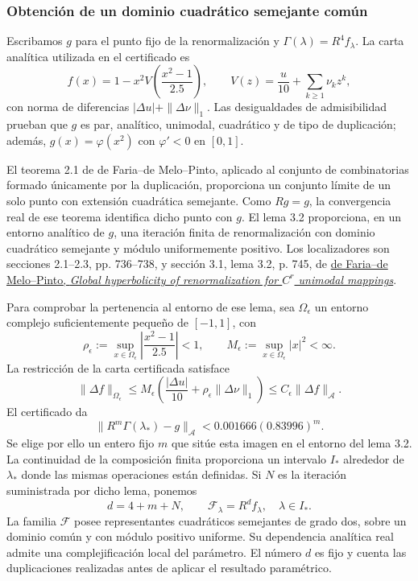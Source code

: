 \subsubsection{Obtención de un dominio cuadrático semejante común}
\label{hmtfg:clasificacion:8.1}

Escribamos \(g\) para el punto fijo de la renormalización y
\(\Gamma(\lambda)=R^4f_\lambda\). La carta analítica utilizada en el certificado es
\[
f(x)=1-x^2V\!\left(\frac{x^2-1}{2.5}\right),\qquad
V(z)=\frac{u}{10}+\sum_{k\ge1}\nu_kz^k,
\]
con norma de diferencias \(|\Delta u|+\|\Delta\nu\|_1\). Las desigualdades de admisibilidad prueban que \(g\) es par, analítico, unimodal, cuadrático y de tipo de duplicación; además, \(g(x)=\varphi(x^2)\) con \(\varphi'<0\) en \([0,1]\).

El teorema 2.1 de de Faria–de Melo–Pinto, aplicado al conjunto de combinatorias formado únicamente por la duplicación, proporciona un conjunto límite de un solo punto con extensión cuadrática semejante. Como \(Rg=g\), la convergencia real de ese teorema identifica dicho punto con \(g\). El lema 3.2 proporciona, en un entorno analítico de \(g\), una iteración finita de renormalización con dominio cuadrático semejante y módulo uniformemente positivo. Los localizadores son secciones 2.1–2.3, pp. 736–738, y sección 3.1, lema 3.2, p. 745, de \href{https://annals.math.princeton.edu/wp-content/uploads/annals-v164-n3-p01.pdf}{de Faria–de Melo–Pinto, \emph{Global hyperbolicity of renormalization for \(C^r\) unimodal mappings}}.

Para comprobar la pertenencia al entorno de ese lema, sea \(\Omega_\epsilon\) un entorno complejo suficientemente pequeño de \([-1,1]\), con
\[
\rho_\epsilon:=\sup_{x\in\Omega_\epsilon}
\left|\frac{x^2-1}{2.5}\right|<1,
\qquad M_\epsilon:=\sup_{x\in\Omega_\epsilon}|x|^2<\infty.
\]
La restricción de la carta certificada satisface
\begin{equation}
\|\Delta f\|_{\Omega_\epsilon}
\le M_\epsilon\left(\frac{|\Delta u|}{10}
          +\rho_\epsilon\|\Delta\nu\|_1\right)
\le C_\epsilon\|\Delta f\|_{\mathcal A}.
\label{hmtfg:clasificacion:eq:16}
\end{equation}
El certificado da
\[
\|R^m\Gamma(\lambda_*)-g\|_{\mathcal A}
<0.001666(0.83996)^m.
\]
Se elige por ello un entero fijo \(m\) que sitúe esta imagen en el entorno del lema 3.2. La continuidad de la composición finita proporciona un intervalo \(I_*\) alrededor de \(\lambda_*\) donde las mismas operaciones están definidas. Si \(N\) es la iteración suministrada por dicho lema, ponemos
\begin{equation}
d=4+m+N,\qquad
\mathcal F_\lambda=R^df_\lambda,\quad \lambda\in I_*.
\label{hmtfg:clasificacion:eq:17}
\end{equation}
La familia \(\mathcal F\) posee representantes cuadráticos semejantes de grado dos, sobre un dominio común y con módulo positivo uniforme. Su dependencia analítica real admite una complejificación local del parámetro. El número \(d\) es fijo y cuenta las duplicaciones realizadas antes de aplicar el resultado paramétrico.

